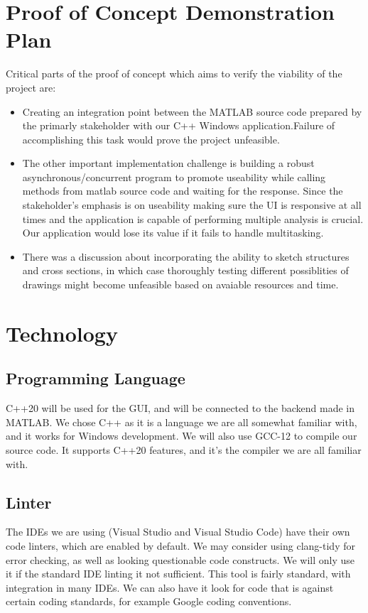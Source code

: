 \documentclass{article}
\begin{document}
\section{Proof of Concept Demonstration Plan}

Critical parts of the proof of concept which aims to verify the viability of the project are: \\
\begin{itemize}
\item Creating an integration point between the MATLAB source code prepared by the primarly stakeholder with our C++ Windows application.Failure of accomplishing this task would prove the project unfeasible.
\item The other important implementation challenge is building a robust asynchronous/concurrent program to promote useability while calling methods from matlab source code and waiting for the response.
Since the stakeholder's emphasis is on useability making sure the UI is responsive at all times and the application is capable of performing multiple analysis is crucial. Our application would lose its value if it fails to handle multitasking.
\item There was a discussion about incorporating the ability to sketch structures and cross sections, in which case thoroughly testing different possiblities of drawings might become unfeasible based on avaiable resources and time.
\end{itemize}
\section{Technology}

\subsection{Programming Language}
C++20 will be used for the GUI, and will be connected to the backend made in MATLAB.
We chose C++ as it is a language we are all somewhat familiar with, and it works for
Windows development. We will also use GCC-12 to compile our source code. It supports C++20
features, and it's the compiler we are all familiar with.

\subsection{Linter}
The IDEs we are using (Visual Studio and Visual Studio Code) have their own code linters, which are enabled by default.
We may consider using clang-tidy for error checking, as well as looking questionable code constructs. We will
only use it if the standard IDE linting it not sufficient. This tool is fairly standard, with integration in many 
IDEs. We can also have it look for code that is against certain coding standards, for example Google coding conventions.
\end{document}
